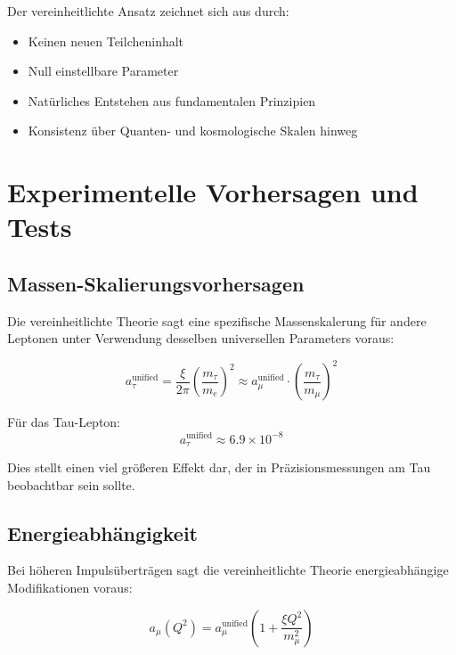 \documentclass[12pt,a4paper]{article}
\newcommand{\xipar}{\xi}
\begin{document}
	Der vereinheitlichte Ansatz zeichnet sich aus durch:
	\begin{itemize}
		\item Keinen neuen Teilcheninhalt
		\item Null einstellbare Parameter
		\item Natürliches Entstehen aus fundamentalen Prinzipien
		\item Konsistenz über Quanten- und kosmologische Skalen hinweg
	\end{itemize}
	
	\section{Experimentelle Vorhersagen und Tests}
	
	\subsection{Massen-Skalierungsvorhersagen}
	\label{subsec:mass_scaling}
	
	Die vereinheitlichte Theorie sagt eine spezifische Massenskalerung für andere Leptonen unter Verwendung desselben universellen Parameters voraus:
	
	\begin{equation}
		a_\tau^{\text{unified}} = \frac{\xipar}{2\pi}\left(\frac{m_\tau}{m_e}\right)^2 \approx a_\mu^{\text{unified}} \cdot \left(\frac{m_\tau}{m_\mu}\right)^2
	\end{equation}
	
	Für das Tau-Lepton:
	\begin{equation}
		a_\tau^{\text{unified}} \approx 6.9 \times 10^{-8}
	\end{equation}
	
	Dies stellt einen viel größeren Effekt dar, der in Präzisionsmessungen am Tau beobachtbar sein sollte.
	
	\subsection{Energieabhängigkeit}
	\label{subsec:energy_dependence}
	
	Bei höheren Impulsüberträgen sagt die vereinheitlichte Theorie energieabhängige Modifikationen voraus:
	
	\begin{equation}
		a_\mu(Q^2) = a_\mu^{\text{unified}} \left(1 + \frac{\xipar Q^2}{m_\mu^2}\right)
	\end{equation}
	
\end{document}
